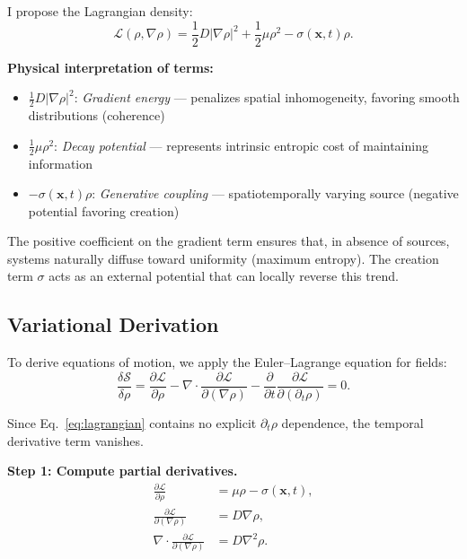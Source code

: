 \documentclass[12pt]{article}
\begin{document}
I propose the Lagrangian density:
\begin{equation}
    \mathcal{L}(\rho, \nabla\rho) = \frac{1}{2} D |\nabla \rho|^2 + \frac{1}{2}\mu \rho^2 - \sigma(\mathbf{x},t) \rho.
    \label{eq:lagrangian}
\end{equation}

\textbf{Physical interpretation of terms:}
\begin{itemize}
    \item $\frac{1}{2}D|\nabla\rho|^2$: \emph{Gradient energy} --- penalizes spatial inhomogeneity, favoring smooth distributions (coherence)
    \item $\frac{1}{2}\mu\rho^2$: \emph{Decay potential} --- represents intrinsic entropic cost of maintaining information
    \item $-\sigma(\mathbf{x},t)\rho$: \emph{Generative coupling} --- spatiotemporally varying source (negative potential favoring creation)
\end{itemize}

The positive coefficient on the gradient term ensures that, in absence of sources, systems naturally diffuse toward uniformity (maximum entropy). The creation term $\sigma$ acts as an external potential that can locally reverse this trend.

\subsection{Variational Derivation}

To derive equations of motion, we apply the Euler--Lagrange equation for fields:
\begin{equation}
    \frac{\delta \mathcal{S}}{\delta \rho} = \frac{\partial \mathcal{L}}{\partial \rho} - \nabla \cdot \frac{\partial \mathcal{L}}{\partial(\nabla\rho)} - \frac{\partial}{\partial t}\frac{\partial \mathcal{L}}{\partial(\partial_t\rho)} = 0.
    \label{eq:euler_lagrange}
\end{equation}

Since Eq.~\eqref{eq:lagrangian} contains no explicit $\partial_t\rho$ dependence, the temporal derivative term vanishes.

\textbf{Step 1: Compute partial derivatives.}
\begin{align}
    \frac{\partial \mathcal{L}}{\partial \rho} &= \mu \rho - \sigma(\mathbf{x},t), \\
    \frac{\partial \mathcal{L}}{\partial(\nabla\rho)} &= D \nabla\rho, \\
    \nabla \cdot \frac{\partial \mathcal{L}}{\partial(\nabla\rho)} &= D \nabla^2 \rho.
\end{align}
\end{document}
